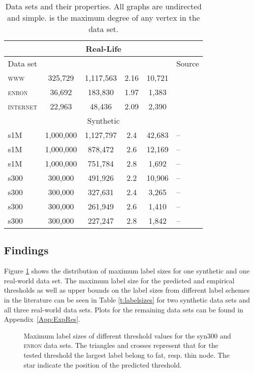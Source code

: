 \documentclass{article}
\theoremstyle{remark}
\begin{document}
\begin{table}[!ht]
\centering
\small
\begin{tabular}{lccccl}\hline
\multicolumn{6}{c}{Real-Life}\\\hline
Data set  &  &  &   &  & Source\\\hline
\textsc{www}      & 325,729        & 1,117,563     & 2.16 & 10,721            & \cite{albert1999internet}\\
\textsc{enron}    &  36,692        &   183,830      & 1.97    &1,383         & \cite{leskovec2009community}\\
\textsc{internet} &  22,963        &    48,436      & 2.09     & 2,390        & \cite{newman}\\\hline

\multicolumn{6}{c}{Synthetic}\\\hline
s1M    & 1,000,000       & 1,127,797      & 2.4    & 42,683 &-- \\
s1M    & 1,000,000       & 878,472        & 2.6    & 12,169 &-- \\
s1M    & 1,000,000       & 751,784         & 2.8   & 1,692  &-- \\
s300    & 300,000        & 491,926        & 2.2    & 10,906 & --\\
s300    & 300,000        & 327,631        & 2.4    & 3,265 & --\\
s300    & 300,000        & 261,949        & 2.6    & 1,410 & --\\
s300    & 300,000        & 227,247        & 2.8    & 1,842 & --\\\hline
\end{tabular}
\caption{Data sets and their properties. All graphs are undirected and simple.  is the maximum degree of any vertex in the data set.}
\label{t:datasets}
\end{table}


\subsection{Findings}
Figure \ref{fig:findings} shows the distribution of maximum label sizes for one synthetic and one real-world data set. The maximum label size
for the predicted and empirical thresholds as well as upper bounds on the label sizes from different label schemes in the literature can be seen in Table \ref{t:labelsizes} for two synthetic
data sets and all three real-world data sets. 
Plots for the remaining data sets can be found in Appendix~\ref{App:ExpRes}.

\begin{figure}[!ht]
\centering
{}\hspace*{-2.5em}
\caption{Maximum label sizes of different threshold values for the   syn300 and \textsc{enron} data sets.
The triangles and crosses represent that for the tested threshold the largest label belong to fat, resp. thin node. The star indicate the position of the predicted threshold.}
\label{fig:findings}\end{figure}
\end{document}
